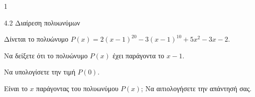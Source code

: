 \begin{ylh}{1}
\item 4.2 Διαίρεση πολυωνύμων
\end{ylh}
Δίνεται το πολυώνυμο $P(x) = 2(x - 1)^{20} - 3(x - 1)^{10} + 5x^2 - 3x - 2$.
\begin{alist}
\item Να δείξετε ότι το πολυώνυμο $P(x)$ έχει παράγοντα το $x - 1$.
\item
\begin{rlist}
\item Να υπολογίσετε την τιμή $P(0)$.
\item Είναι το $x$ παράγοντας του πολυωνύμου $P(x)$; Να αιτιολογήσετε την απάντησή σας.
\end{rlist}
\end{alist}

